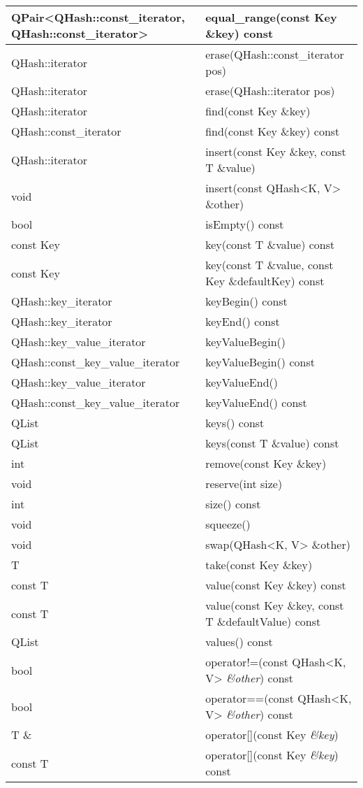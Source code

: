 \begin{longtable}{|l|l|}
\hline
QPair<QHash::const\_iterator, QHash::const\_iterator> &
                                                        equal\_range(const
                                                        Key \&key)
                                                        const\\
\hline
QHash::iterator &	erase(QHash::const\_iterator pos)\\
\hline
QHash::iterator &	erase(QHash::iterator pos)\\
\hline
QHash::iterator &	find(const Key \&key)\\
\hline
QHash::const\_iterator& 	find(const Key \&key) const\\
\hline
QHash::iterator 	&insert(const Key \&key, const T \&value)\\
\hline
void& 	insert(const QHash<K, V> \&other)\\
\hline
bool &	isEmpty() const\\
\hline
const Key& 	key(const T \&value) const\\
\hline
const Key &	key(const T \&value, const Key \&defaultKey) const\\
\hline
QHash::key\_iterator &	keyBegin() const\\
\hline
QHash::key\_iterator &	keyEnd() const\\
\hline
QHash::key\_value\_iterator 	&keyValueBegin()\\
\hline
QHash::const\_key\_value\_iterator& 	keyValueBegin() const\\
\hline
QHash::key\_value\_iterator 	&keyValueEnd()\\
\hline
QHash::const\_key\_value\_iterator &	keyValueEnd() const\\
\hline
QList& 	keys() const\\
\hline
QList& 	keys(const T \&value) const\\
\hline
int &	remove(const Key \&key)\\
\hline
void &	reserve(int size)\\
\hline
int &	size() const\\
\hline
void &	squeeze()\\
\hline
void &	swap(QHash<K, V> \&other)\\
\hline
T 	&take(const Key \&key)\\
\hline
const T &	value(const Key \&key) const\\
\hline
const T &	value(const Key \&key, const T \&defaultValue) const\\
\hline
QList 	&values() const\\
\hline
bool 	&operator!=(const QHash<K, V> \emph{\&other}) const\\
\hline
bool 	&operator==(const QHash<K, V> \emph{\&other}) const\\
\hline
T \& 	&operator[](const Key \emph{\&key})\\
\hline
const T& 	operator[](const Key \emph{\&key}) const\\
\hline
\end{longtable}

